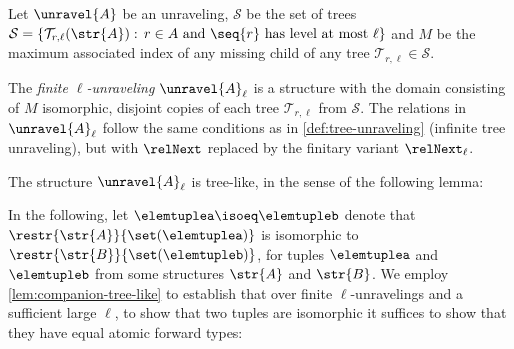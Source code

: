 \begin{definition}
  Let $\unravel{A}$ be an unraveling, $\mathcal{S}$ be the set of trees $\mathcal{S} = \left\{ \mathcal{T}_{r,\ell}(\str{A}):\, r \in A \text{ and } \seq{r}\ \text{has level at most $\ell$}\right\}$ and
  $M$ be the maximum associated index of any missing child of any tree $\mathcal{T}_{r,\ell} \in \mathcal{S}$.

  The \emph{finite $\ell$-unraveling} $\unravel{A}_{\ell}$ is a structure with the domain consisting of $M$ isomorphic, disjoint copies of each tree $\mathcal{T}_{r,\ell}$ from $\mathcal{S}$.
  The relations in $\unravel{A}_{\ell}$ follow the same conditions as in \cref{def:tree-unraveling} (infinite tree unraveling), but with $\relNext$ replaced by the finitary variant $\relNext_{\ell}$.
\end{definition}

\noindent
The structure $\unravel{A}_{\ell}$ is tree-like, in the sense of the following lemma:


In the following, let $\elemtuplea \isoeq \elemtupleb$ denote that $\restr{\str{A}}{\set(\elemtuplea)}$ is isomorphic to $\restr{\str{B}}{\set(\elemtupleb)}$, for tuples $\elemtuplea$ and $\elemtupleb$ from some structures $\str{A}$ and $\str{B}$.
We employ \cref{lem:companion-tree-like} to establish that over finite $\ell$-unravelings and a sufficient large $\ell$, to show that two tuples are isomorphic it suffices to show that they have equal atomic forward types:


